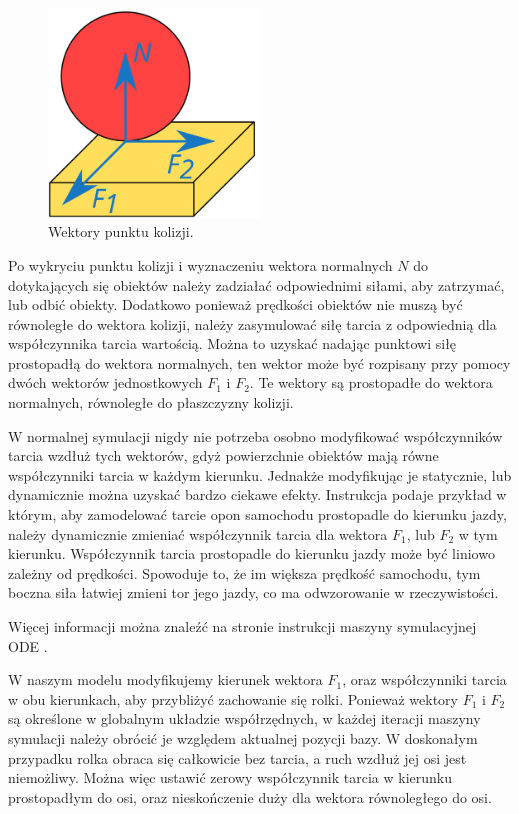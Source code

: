 \begin{figure}[H]
\centering
 \includegraphics[width=0.5\textwidth]{graphics/friction.pdf}
\caption{Wektory punktu kolizji.}
\end{figure} 

Po wykryciu punktu kolizji i wyznaczeniu wektora normalnych $N$ do dotykających się obiektów należy zadziałać odpowiednimi siłami, aby zatrzymać, lub odbić obiekty.
Dodatkowo ponieważ prędkości obiektów nie muszą być równoległe do wektora kolizji, należy zasymulować siłę tarcia z odpowiednią dla współczynnika tarcia wartością.
Można to uzyskać nadając punktowi siłę prostopadłą do wektora normalnych, ten wektor może być rozpisany przy pomocy dwóch wektorów jednostkowych $F_1$ i $F_2$. 
Te wektory są prostopadłe do wektora normalnych, równoległe do płaszczyzny kolizji.

W normalnej symulacji nigdy nie potrzeba osobno modyfikować współczynników tarcia wzdłuż tych wektorów, gdyż powierzchnie obiektów mają równe współczynniki tarcia w każdym kierunku.
Jednakże modyfikując je statycznie, lub dynamicznie można uzyskać bardzo ciekawe efekty.
Instrukcja podaje przykład w którym, aby zamodelować tarcie opon samochodu prostopadle do kierunku jazdy, należy dynamicznie zmieniać współczynnik tarcia dla wektora $F_1$, lub $F_2$ w tym kierunku.
Współczynnik tarcia prostopadle do kierunku jazdy może być liniowo zależny od prędkości.
Spowoduje to, że im większa prędkość samochodu, tym boczna siła łatwiej zmieni tor jego jazdy, co ma odwzorowanie w rzeczywistości.

Więcej informacji można znaleźć na stronie instrukcji maszyny symulacyjnej ODE \cite{ode_contact}.

W naszym modelu modyfikujemy kierunek wektora $F_1$, oraz współczynniki tarcia w obu kierunkach, aby przybliżyć zachowanie się rolki.
Ponieważ wektory $F_1$ i $F_2$ są określone w globalnym układzie współrzędnych, w każdej iteracji maszyny symulacji należy obrócić je względem aktualnej pozycji bazy.
W doskonałym przypadku rolka obraca się całkowicie bez tarcia, a ruch wzdłuż jej osi jest niemożliwy.
Można więc ustawić zerowy współczynnik tarcia w kierunku prostopadłym do osi, oraz nieskończenie duży dla wektora równoległego do osi.

